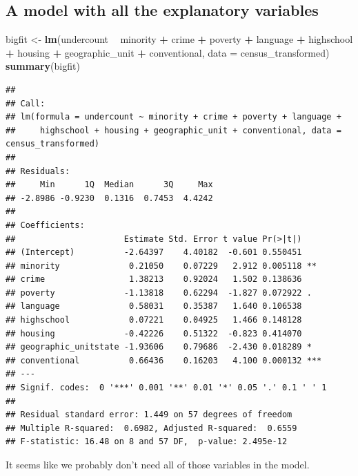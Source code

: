 \documentclass[landscape]{article}
\newenvironment{Shaded}{\begin{snugshade}}{\end{snugshade}}
\newcommand{\KeywordTok}[1]{\textcolor[rgb]{0.13,0.29,0.53}{\textbf{#1}}}
\newcommand{\DataTypeTok}[1]{\textcolor[rgb]{0.13,0.29,0.53}{#1}}
\newcommand{\StringTok}[1]{\textcolor[rgb]{0.31,0.60,0.02}{#1}}
\newcommand{\OperatorTok}[1]{\textcolor[rgb]{0.81,0.36,0.00}{\textbf{#1}}}
\newcommand{\NormalTok}[1]{#1}
\begin{document}
\newpage

\subsection{A model with all the explanatory
variables}\label{a-model-with-all-the-explanatory-variables}

\begin{Shaded}
\begin{Highlighting}[]
\NormalTok{bigfit <-}\StringTok{ }\KeywordTok{lm}\NormalTok{(undercount }\OperatorTok{~}\StringTok{ }\NormalTok{minority }\OperatorTok{+}\StringTok{ }\NormalTok{crime }\OperatorTok{+}\StringTok{ }\NormalTok{poverty }\OperatorTok{+}\StringTok{ }\NormalTok{language }\OperatorTok{+}\StringTok{ }\NormalTok{highschool }\OperatorTok{+}\StringTok{ }\NormalTok{housing }\OperatorTok{+}\StringTok{ }\NormalTok{geographic_unit }\OperatorTok{+}\StringTok{ }\NormalTok{conventional,}
    \DataTypeTok{data =}\NormalTok{ census_transformed)}
\KeywordTok{summary}\NormalTok{(bigfit)}
\end{Highlighting}
\end{Shaded}

\begin{verbatim}
## 
## Call:
## lm(formula = undercount ~ minority + crime + poverty + language + 
##     highschool + housing + geographic_unit + conventional, data = census_transformed)
## 
## Residuals:
##     Min      1Q  Median      3Q     Max 
## -2.8986 -0.9230  0.1316  0.7453  4.4242 
## 
## Coefficients:
##                      Estimate Std. Error t value Pr(>|t|)    
## (Intercept)          -2.64397    4.40182  -0.601 0.550451    
## minority              0.21050    0.07229   2.912 0.005118 ** 
## crime                 1.38213    0.92024   1.502 0.138636    
## poverty              -1.13818    0.62294  -1.827 0.072922 .  
## language              0.58031    0.35387   1.640 0.106538    
## highschool            0.07221    0.04925   1.466 0.148128    
## housing              -0.42226    0.51322  -0.823 0.414070    
## geographic_unitstate -1.93606    0.79686  -2.430 0.018289 *  
## conventional          0.66436    0.16203   4.100 0.000132 ***
## ---
## Signif. codes:  0 '***' 0.001 '**' 0.01 '*' 0.05 '.' 0.1 ' ' 1
## 
## Residual standard error: 1.449 on 57 degrees of freedom
## Multiple R-squared:  0.6982, Adjusted R-squared:  0.6559 
## F-statistic: 16.48 on 8 and 57 DF,  p-value: 2.495e-12
\end{verbatim}

It seems like we probably don't need all of those variables in the
model.
\end{document}
